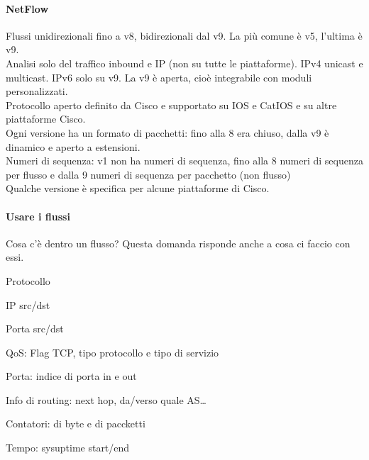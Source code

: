 \documentclass[10pt]{book}
\begin{document}
\paragraph{NetFlow} Flussi unidirezionali fino a v8, bidirezionali dal v9. La più comune è v5, l'ultima è v9.\\
Analisi solo del traffico inbound e IP (non su tutte le piattaforme). IPv4 unicast e multicast. IPv6 solo su v9. La v9 è aperta, cioè integrabile con moduli personalizzati.\\
Protocollo aperto definito da Cisco e supportato su IOS e CatIOS e su altre piattaforme Cisco.\\
Ogni versione ha un formato di pacchetti: fino alla 8 era chiuso, dalla v9 è dinamico e aperto a estensioni.\\
Numeri di sequenza: v1 non ha numeri di sequenza, fino alla 8 numeri di sequenza per flusso e dalla 9 numeri di sequenza per pacchetto (non flusso)\\
Qualche versione è specifica per alcune piattaforme di Cisco.
\paragraph{Usare i flussi} Cosa c'è dentro un flusso? Questa domanda risponde anche a cosa ci faccio con essi.
\begin{list}{}{Nella parte di chiave: la quintupletta}
	\item Protocollo
	\item IP src/dst
	\item Porta src/dst
\end{list}
\begin{list}{}{Altre info}
	\item QoS: Flag TCP, tipo protocollo e tipo di servizio
	\item Porta: indice di porta in e out
	\item Info di routing: next hop, da/verso quale AS\ldots
	\item Contatori: di byte e di paccketti
	\item Tempo: sysuptime start/end
\end{list}
\end{document}
